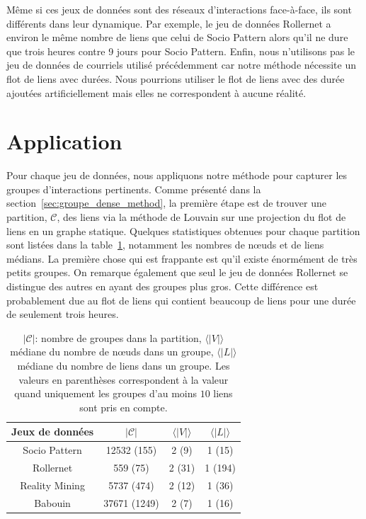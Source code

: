 Même si ces jeux de données sont des réseaux d'interactions face-à-face, ils sont différents dans leur dynamique.
Par exemple, le jeu de données Rollernet a environ le même nombre de liens que celui de Socio Pattern alors qu'il ne dure que trois heures contre 9 jours pour Socio Pattern.
Enfin, nous n'utilisons pas le jeu de données de courriels utilisé précédemment car notre méthode nécessite un flot de liens avec durées.
Nous pourrions utiliser le flot de liens avec des durée ajoutées artificiellement mais elles ne correspondent à aucune réalité.



\section{Application}
\label{sec:groupe_dense_result}

Pour chaque jeu de données, nous appliquons notre méthode pour capturer les groupes d'interactions pertinents.
Comme présenté dans la section~\ref{sec:groupe_dense_method}, la première étape est de trouver une partition, $\mathcal{C}$, des liens via la méthode de Louvain sur une projection du flot de liens en un graphe statique.
Quelques statistiques obtenues pour chaque partition sont listées dans la table~\ref{tab:partition_spec_gd}, notamment les nombres de n\oe uds et de liens médians.
La première chose qui est frappante est qu'il existe énormément de très petits groupes.
On remarque également que seul le jeu de données Rollernet se distingue des autres en ayant des groupes plus gros.
Cette différence est probablement due au flot de liens qui contient beaucoup de liens pour une durée de seulement trois heures.

\begin{table}
\centering
\begin{tabular}{|c|c|c|c|}
\hline \rule[-1ex]{0pt}{3.5ex}
Jeux de données & $|\mathcal{C}|$ & $\langle|V|\rangle$  & $\langle|L|\rangle$ \\
\hline
Socio Pattern & 12532 (155) & 2 (9) & 1 (15) \\
Rollernet& 559 (75) & 2 (31) & 1 (194) \\
Reality Mining & 5737 (474) & 2 (12) & 1 (36) \\
Babouin & 37671 (1249)  &  2 (7)  & 1 (16) \\
\hline
\end{tabular}
\caption{$|\mathcal{C}|$: nombre de groupes dans la partition, $\langle|V|\rangle$ médiane du nombre de n\oe uds dans un groupe, $\langle|L|\rangle$ médiane du nombre de liens dans un groupe.
Les valeurs en parenthèses correspondent à la valeur quand uniquement les groupes d'au moins $10$ liens sont pris en compte.}
\label{tab:partition_spec_gd}       %
\end{table}



